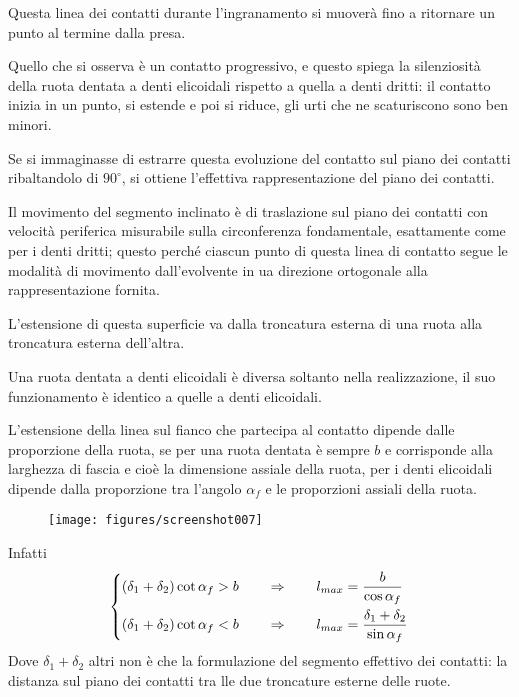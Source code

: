 \documentclass[a4paper, 15pt]{article}
\begin{document}
\begin{adjustwidth}{2in}{}
		Questa linea dei contatti durante l'ingranamento si muoverà fino a ritornare un punto al termine dalla presa. 
		
		Quello che si osserva è un contatto progressivo, e questo spiega la silenziosità della ruota dentata a denti elicoidali rispetto a quella a denti dritti: il contatto inizia in un punto, si estende e poi si riduce, gli urti che ne scaturiscono sono ben minori. \newline
		
		Se si immaginasse di estrarre questa evoluzione del contatto sul piano dei contatti ribaltandolo di $90^\circ$, si ottiene l'effettiva rappresentazione del piano dei contatti. 
		
		Il movimento del segmento inclinato è di traslazione sul piano dei contatti con velocità periferica misurabile sulla circonferenza fondamentale, esattamente come per i denti dritti; questo perché ciascun punto di questa linea di contatto segue le modalità di movimento dall'evolvente in ua direzione ortogonale alla rappresentazione fornita.
		
		L'estensione di questa superficie va dalla troncatura esterna di una ruota alla troncatura esterna dell'altra.\newline 
		
		Una ruota dentata a denti elicoidali è diversa soltanto nella realizzazione, il suo funzionamento è identico a quelle a denti elicoidali. \newline 
		
		L'estensione della linea sul fianco che partecipa al contatto dipende dalle proporzione della ruota, se per una ruota dentata è sempre $b$ e corrisponde alla larghezza di fascia e cioè la dimensione assiale della ruota, per i denti elicoidali dipende dalla proporzione tra l'angolo $\alpha_f$ e le proporzioni assiali della ruota.
		\begin{figure}[H]
			\centering
			\texttt{[image: figures/screenshot007]}
			\caption{}
			\label{fig:screenshot007}
		\end{figure}		
		Infatti  
		\[\begin{dcases}
		(\delta_1+\delta_2)\cot\alpha_f>b \qquad \Rightarrow\qquad l_{max} = \dfrac{b}{\cos\alpha_f} \\
		(\delta_1+\delta_2)\cot\alpha_f<b \qquad \Rightarrow\qquad l_{max} = \dfrac{\delta_1+\delta_2}{\sin\alpha_f}
		\end{dcases}\] 
		Dove $\delta_1+\delta_2$ altri non è che la formulazione del segmento effettivo dei contatti: la distanza sul piano dei contatti tra lle due troncature esterne delle ruote. \newline 
		

\end{adjustwidth}
\end{document}
